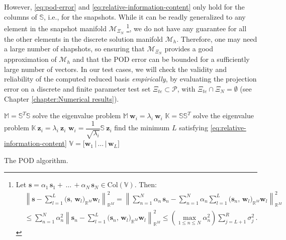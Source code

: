 \documentclass[12pt, a4paper, twoside, openright, notitlepage]{report}
\numberwithin{equation}{chapter}
\theoremstyle{theorem}
\theoremstyle{definition}
\theoremstyle{remark}
\theoremstyle{proposition}
\numberwithin{figure}{chapter}
\newcommand{\norm}[1]{\left\lVert#1\right\rVert}
\begin{document}
		However, \eqref{eq:pod-error} and \eqref{eq:relative-information-content} only hold for the columns of $\mathbb{S}$, i.e., for the snapshots. While it can be readly generalized to any element in the snapshot manifold $\mathcal{M}_{\Xi_N}$ \footnote{
		Let $\mathbf{s} = \alpha_1 \, \mathbf{s}_1 + \, \ldots \, + \alpha_N \, \mathbf{s}_N \in \text{Col}(\mathbb{V})$. Then:
		\begin{equation*}
			\begin{aligned}
				& \norm{\mathbf{s} - \sum_{l = 1}^L \big( \mathbf{s}, \, \mathbf{w}_l \big)_{\mathbb{R}^M} \mathbf{w}_l}_{\mathbb{R}^M}^2 = \norm{\sum_{n = 1}^N \alpha_n \, \mathbf{s}_n - \sum_{n = 1}^N \alpha_n \sum_{l = 1}^L \big( \mathbf{s}_n, \, \mathbf{w}_l \big)_{\mathbb{R}^M} \mathbf{w}_l}_{\mathbb{R}^M}^2 \\
				& \leq \sum_{n = 1}^N \alpha_n^2 \norm{\mathbf{s}_n - \sum_{l = 1}^L \big( \mathbf{s}_n, \, \mathbf{w}_l \big)_{\mathbb{R}^M} \mathbf{w}_l}_{\mathbb{R}^M}^2 \leq \left( \max_{1 \leq n \leq N} \alpha_n^2 \right) \sum_{j = L+1}^R \sigma_j^2 \, .
			\end{aligned}
		\end{equation*}}, we do not have any guarantee for all the other elements in the discrete solution manifold $\mathcal{M}_h$. Therefore, one may need a large number of shapshots, so ensuring that $\mathcal{M}_{\Xi_N}$ provides a good approximation of $\mathcal{M}_h$ and that the POD error can be bounded for a sufficiently large number of vectors. In our test cases, we will check the validity and reliability of the computed reduced basis \emph{empirically}, by evaluating the projection error on a discrete and finite parameter test set $\Xi_{te} \subset \mathcal{P}$, with $\Xi_{te} \cap \Xi_N = \emptyset$ (see Chapter \ref{chapter:Numerical results}).
		
		\begin{algorithm}[H]	
			\begin{algorithmic}[1]
						\State $\mathbb{M} = \mathbb{S}^T \mathbb{S}$
							\State solve the eigenvalue problem $\mathbb{M} ~ \mathbf{w}_i = \lambda_i ~ \mathbf{w}_i$
						\EndFor
					\Else
						\State $\mathbb{K} = \mathbb{S} \mathbb{S}^T$
							\State solve the eigenvalue problem $\mathbb{K} ~ \mathbf{z}_i = \lambda_i ~ \mathbf{z}_i$
							\State $\mathbf{w}_i = \dfrac{1}{\sqrt{\lambda_i}} \mathbb{S} ~ \mathbf{z}_i$
						\EndFor
					\EndIf
					\State find the minimum $L$ satisfying \eqref{eq:relative-information-content}
					\State $\mathbb{V} = \big[ \mathbf{w}_1 \, \big| \, \ldots \, \big| \, \mathbf{w}_L \big]$
				\EndFunction
			\end{algorithmic}
			
			\caption{The POD algorithm.}
			\label{alg:pod}
		\end{algorithm}
		
\end{document}
